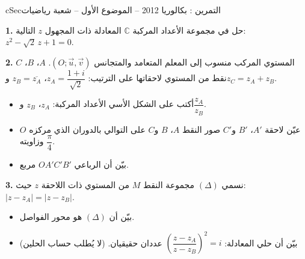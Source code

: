 \documentclass[12pt,a4paper]{article}
\newenvironment{BOX}[2]{\begin{otherlanguage}{english}\begin{arbox}{#1}{#2}}{\end{arbox}\end{otherlanguage}}
\newcounter{exo}
\newenvironment{tamrin}[1]{\stepcounter{exo}\begin{BOX}{cSec}{التمرين \theexo: #1}}{\end{BOX}}
\newenvironment{sq}{\begin{itemize}[leftmargin=2.4em,itemsep=3pt]}{\end{itemize}}
\newcommand{\qa}{\item[(أ)]}\newcommand{\qb}{\item[(ب)]}\newcommand{\qc}{\item[(جـ)]}\newcommand{\qd}{\item[(د)]}\newcommand{\qe}{\item[(هـ)]}
\newcommand{\QQ}[1]{\par\smallskip\textbf{#1.} }
\begin{document}
\begin{tamrin}{بكالوريا 2012 -- الموضوع الأول -- شعبة رياضيات}
\QQ{1} حل في مجموعة الأعداد المركبة $\mathbb C$ المعادلة ذات المجهول $z$ التالية: $z^2-\sqrt2\,z+1=0$.
\QQ{2} المستوي المركب منسوب إلى المعلم المتعامد والمتجانس $(O;\vec u,\vec v)$. $A$، $B$، $C$ نقط من المستوي لاحقاتها على الترتيب: $z_A=\dfrac{1+i}{\sqrt2}$، $z_B=\overline{z_A}$ و$z_C=z_A+z_B$.
\begin{sq}
\qa أكتب على الشكل الأسي الأعداد المركبة: $z_A$، $z_B$ و$\dfrac{z_A}{z_B}$.
\qb عيّن لاحقة $A'$، $B'$ و$C'$ صور النقط $A$، $B$ و$C$ على التوالي بالدوران الذي مركزه $O$ وزاويته $\dfrac{\pi}{4}$.
\qc بيّن أن الرباعي $OA'C'B'$ مربع.
\end{sq}
\QQ{3} نسمي $(\Delta)$ مجموعة النقط $M$ من المستوي ذات اللاحقة $z$ حيث: $|z-z_A|=|z-z_B|$.
\begin{sq}
\qa بيّن أن $(\Delta)$ هو محور الفواصل.
\qb بيّن أن حلي المعادلة: $\left(\dfrac{z-z_A}{z-z_B}\right)^2=i$ عددان حقيقيان. (لا يُطلب حساب الحلين)
\end{sq}
\end{tamrin}
\end{document}
